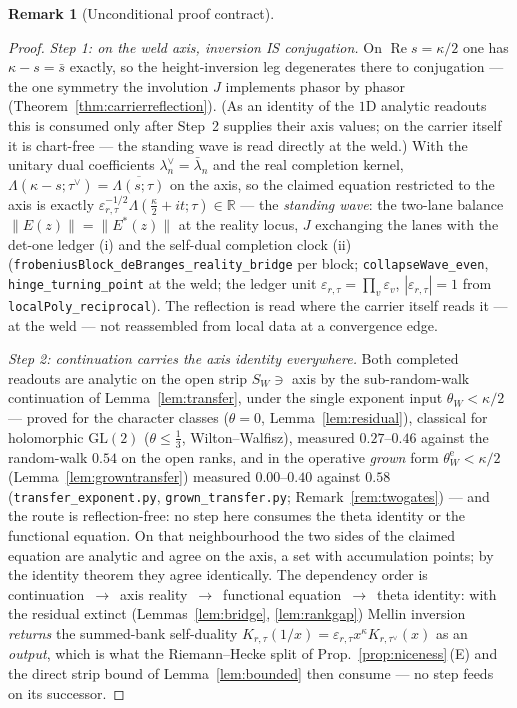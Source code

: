 \documentclass[11pt]{article}
\theoremstyle{definition}
\newtheorem{remark}[theorem]{Remark}
\renewcommand{\Re}{\operatorname{Re}}
\begin{document}
\begin{remark}[Unconditional proof contract]
\begin{enumerate}
\begin{proof}
\emph{Step 1: on the weld axis, inversion IS conjugation.} On $\Re s=\kappa/2$ one has $\kappa-s=\bar s$
exactly, so the height-inversion leg degenerates there to conjugation --- the one symmetry the involution $J$
implements phasor by phasor (Theorem~\ref{thm:carrierreflection}). (As an identity of the $1$D analytic
readouts this is consumed only after Step~2 supplies their axis values; on the carrier itself it is chart-free
--- the standing wave is read directly at the weld.) With the unitary dual coefficients
$\lambda_n^{\vee}=\bar\lambda_n$ and the real completion kernel,
$\Lambda(\kappa-s;\tau^\vee)=\overline{\Lambda(s;\tau)}$ on the axis, so the claimed equation restricted to
the axis is exactly $\varepsilon_{r,\tau}^{-1/2}\Lambda(\tfrac\kappa2+it;\tau)\in\mathbb R$ --- the
\emph{standing wave}: the two-lane balance $\|E(z)\|=\|E^{*}(z)\|$ at the reality locus, $J$ exchanging the
lanes with the det-one ledger \textup{(i)} and the self-dual completion clock \textup{(ii)}
(\texttt{frobeniusBlock\_deBranges\_reality\_bridge} per block; \texttt{collapseWave\_even},
\texttt{hinge\_turning\_point} at the weld; the ledger unit $\varepsilon_{r,\tau}=\prod_v\varepsilon_v$,
$|\varepsilon_{r,\tau}|=1$ from \texttt{localPoly\_reciprocal}). The reflection is read where the carrier
itself reads it --- at the weld --- not reassembled from local data at a convergence edge.

\emph{Step 2: continuation carries the axis identity everywhere.} Both completed readouts are analytic on the
open strip $S_W\ni$ axis by the sub-random-walk continuation of Lemma~\ref{lem:transfer}, under the single
exponent input $\theta_W<\kappa/2$ --- proved for the character classes ($\theta=0$,
Lemma~\ref{lem:residual}), classical for holomorphic $\mathrm{GL}(2)$ ($\theta\le\tfrac13$, Wilton--Walfisz),
measured $0.27$--$0.46$ against the random-walk $0.54$ on the open ranks, and in the operative \emph{grown}
form $\theta^{\mathrm e}_W<\kappa/2$ (Lemma~\ref{lem:growntransfer}) measured $0.00$--$0.40$ against $0.58$
(\texttt{transfer\_exponent.py}, \texttt{grown\_transfer.py}; Remark~\ref{rem:twogates}) --- and the route is
reflection-free: no step here consumes the theta identity or the functional equation. On that neighbourhood
the two sides of the claimed equation are analytic and agree on the axis, a set with accumulation points; by
the identity theorem they agree identically. The dependency order is
continuation~$\to$~axis reality~$\to$~functional equation~$\to$~theta identity: with the residual extinct
(Lemmas~\ref{lem:bridge}, \ref{lem:rankgap}) Mellin inversion \emph{returns} the summed-bank self-duality
$K_{r,\tau}(1/x)=\varepsilon_{r,\tau}x^{\kappa}K_{r,\tau^\vee}(x)$ as an \emph{output}, which is what the
Riemann--Hecke split of Prop.~\ref{prop:niceness}\,(E) and the direct strip bound of Lemma~\ref{lem:bounded}
then consume --- no step feeds on its successor.


\end{proof}
\end{enumerate}
\end{remark}
\end{document}
